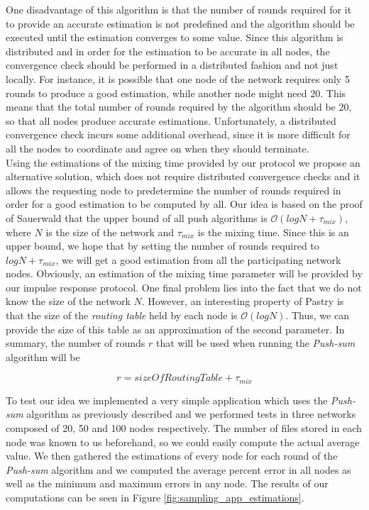 \documentclass[a4paper,11pt,twoside]{report}
\begin{document}
One disadvantage of this algorithm is that the number of rounds required for it to provide an accurate estimation is not predefined and the algorithm should be executed until the estimation converges to some value. Since this algorithm is distributed and in order for the estimation to be accurate in all nodes, the convergence check should be performed in a distributed fashion and not just locally. For instance, it is possible that one node of the network requires only 5 rounds to produce a good estimation, while another node might need 20. This means that the total number of rounds required by the algorithm should be 20, so that all nodes produce accurate estimations. Unfortunately, a distributed convergence check incurs some additional overhead, since it is more difficult for all the nodes to coordinate and agree on when they should terminate. \\

Using the estimations of the mixing time provided by our protocol we propose an alternative solution, which does not require distributed convergence checks and it allows the requesting node to predetermine the number of rounds required in order for a good estimation to be computed by all. Our idea is based on the proof of Sauerwald \cite{Sauerwald:2007:MEE:1781574.1781600} that the upper bound of all push algorithms is $\mathcal{O}(logN + \tau_{mix})$, where $N$ is the size of the network and $\tau_{mix}$ is the mixing time. Since this is an upper bound, we hope that by setting the number of rounds required to $logN + \tau_{mix}$, we will get a good estimation from all the participating network nodes. Obviously, an estimation of the mixing time parameter will be provided by our impulse response protocol. One final problem lies into the fact that we do not know the size of the network $N$. However, an interesting property of Pastry is that the size of the \textit{routing table} held by each node is $\mathcal{O}(logN)$. Thus, we can provide the size of this table as an approximation of the second parameter. In summary, the number of rounds $r$ that will be used when running the \textit{Push-sum} algorithm will be 

\begin{equation}
\label{eq:sampling_rounds}
r = sizeOfRoutingTable+\tau_{mix}
\end{equation}

To test our idea we implemented a very simple application which uses the \textit{Push-sum} algorithm as previously described and we performed tests in three networks composed of 20, 50 and 100 nodes respectively. The number of files stored in each node was known to us beforehand, so we could easily compute the actual average value. We then gathered the estimations of every node for each round of the \textit{Push-sum} algorithm and we computed the average percent error in all nodes as well as the minimum and maximum errors in any node. The results of our computations can be seen in Figure \ref{fig:sampling_app_estimations}.\\
\end{document}
